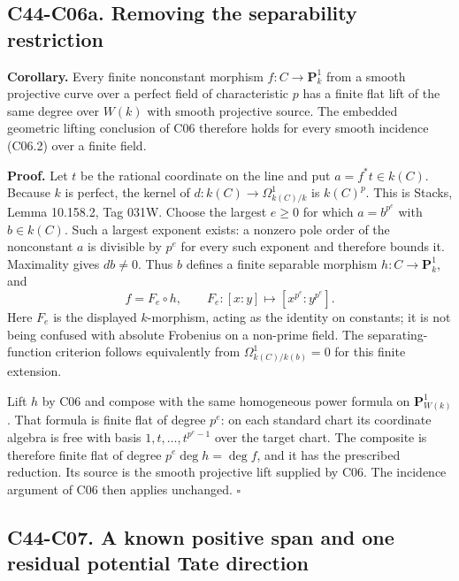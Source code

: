 \documentclass[11pt]{article}
\theoremstyle{remark}\newtheorem{remark}[theorem]{Remark}
\begin{document}
\subsection*{C44-C06a. Removing the separability restriction}

\textbf{Corollary.}
Every finite nonconstant morphism $f:C\to\mathbf P^1_k$
from a smooth projective curve over a perfect field of
characteristic $p$ has a finite flat lift of the same
degree over $W(k)$ with smooth projective source.
The embedded geometric lifting conclusion of C06
therefore holds for every smooth incidence (C06.2)
over a finite field.

\textbf{Proof.}
Let $t$ be the rational coordinate on the line and put
$a=f^*t\in k(C)$. Because $k$ is perfect, the kernel
of $d:k(C)\to\Omega^1_{k(C)/k}$ is $k(C)^p$.
This is Stacks, Lemma 10.158.2, Tag 031W.
Choose the largest $e\ge0$ for which
$a=b^{p^e}$ with $b\in k(C)$. Such a largest exponent
exists: a nonzero pole order of the nonconstant $a$
is divisible by $p^e$ for every such exponent and
therefore bounds it. Maximality gives $db\ne0$.
Thus $b$ defines a finite separable morphism
$h:C\to\mathbf P^1_k$, and
\[
 f=F_e\circ h,\qquad
 F_e:[x:y]\longmapsto[x^{p^e}:y^{p^e}].                      \tag{C06a.1}
\]
Here $F_e$ is the displayed $k$-morphism, acting as
the identity on constants; it is not being confused
with absolute Frobenius on a non-prime field.
The separating-function criterion follows equivalently
from $\Omega^1_{k(C)/k(b)}=0$ for this finite extension.

Lift $h$ by C06 and compose with the same homogeneous
power formula on $\mathbf P^1_{W(k)}$. That formula
is finite flat of degree $p^e$: on each standard
chart its coordinate algebra is free with basis
$1,t,\ldots,t^{p^e-1}$ over the target chart.
The composite is therefore finite flat of degree
$p^e\deg h=\deg f$, and it has the prescribed reduction.
Its source is the smooth projective lift supplied
by C06. The incidence argument of C06 then applies
unchanged. \hfill$\square$

\subsection*{C44-C07. A known positive span and one residual potential Tate direction}
\end{document}
